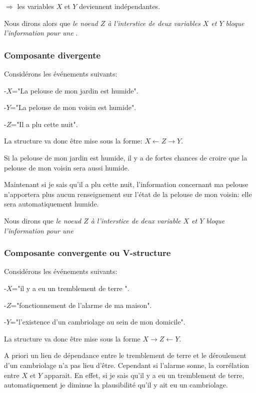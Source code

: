 \documentclass[a4paper]{article}
\begin{document}
$\Longrightarrow$ les variables  $X$ et $Y$ deviennent indépendantes.


Nous dirons alors que \emph{le noeud $Z$ à l'interstice de deux variables $X$ et $Y$ bloque l'information pour une }.

\subsubsection{Composante divergente}
Considérons  les événements suivants:

-$X$="La pelouse de mon jardin est humide".

-$Y$="La pelouse de mon voisin est humide".

-$Z$="Il a plu cette nuit".

La structure va donc être mise  sous la forme: $X\longleftarrow Z \longrightarrow Y$.

Si la pelouse de mon jardin est humide,
il y a de fortes chances de croire que la pelouse de mon voisin sera aussi humide.

Maintenant si je sais qu'il a plu cette nuit,
l'information concernant ma pelouse n'apportera plus aucun renseignement sur l'état de la pelouse de mon voisin:
elle sera automatiquement humide.


Nous dirons que \emph{le noeud $Z$ à l'interstice de deux variable $X$ et $Y$ bloque l'information pour une }

\subsubsection{Composante convergente ou V-structure}

Considérons les événements suivants:

-$X$="il y a eu un tremblement de terre ".

-$Z$="fonc\-tion\-ne\-ment de l'alarme de ma maison".

-$Y$="l'existence d'un cambriolage au sein de mon domicile".

La structure va donc être mise  sous la forme $X\longrightarrow Z \longleftarrow Y$.

A priori un lien de dépendance entre le tremblement de terre et le déroulement d'un cambriolage n'a pas lieu d'être.
Cependant si  l'alarme sonne,
la corrélation entre $X$ et $Y$ apparait.
En effet, si je sais qu'il y a eu un tremblement de terre,
automatiquement je diminue la plausibilité qu'il y ait eu un cambriolage.
\end{document}
